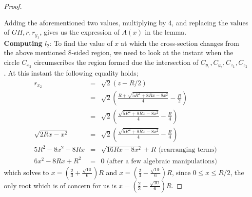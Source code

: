 \documentclass[conference]{IEEEtran}
\begin{document}
\begin{proof}
\begin{itemize}
\end{itemize}
Adding the aforementioned two values, multiplying by 4, and replacing the values of $GH, r, r_{y_1}$, gives us the expression of $A(x)$ in the lemma. \\
\textbf{Computing $l_2$}:
To find the value of $x$ at which the cross-section changes from the above mentioned 8-sided region, we need
to look at the instant when the circle $C_{x_2}$ circumscribes the region formed due the intersection of
$C_{y_1}, C_{y_2}, C_{z_1}, C_{z_2} $. At this instant the following equality holds;
\small
\begin{eqnarray*}
r_{x_2} &=& \sqrt{2} \left( z - R/2 \right) \\
&=& \sqrt{2}\left( \frac{R + \sqrt{5R^2 + 8Rx - 8x^2}}{4} - \frac{R}{2}\right) \\
& =&  \sqrt{2}\left( \frac{\sqrt{5R^2 + 8Rx - 8x^2}}{4} - \frac{R}{4}\right) \\
\sqrt{2Rx -x^2} &=& \sqrt{2}\left( \frac{\sqrt{5R^2 + 8Rx - 8x^2}}{4} - \frac{R}{4}\right) \\
5R^2 - 8x^2 + 8Rx &=& \sqrt{16Rx - 8x^2} + R \mbox{ (rearranging terms) } \\
6x^2 - 8Rx + R^2 &=& 0   \mbox{ (after a few algebraic manipulations) }
\end{eqnarray*}
which solves to $x = (\frac{2}{3} + \frac{\sqrt{10}}{6})R$ and $x = (\frac{2}{3} - \frac{\sqrt{10}}{6})R$, since $0 \leq x \leq R/2$, the only root which is of concern for
us is $x =  (\frac{2}{3} - \frac{\sqrt{10}}{6})R$.
\end{proof}
\end{document}
